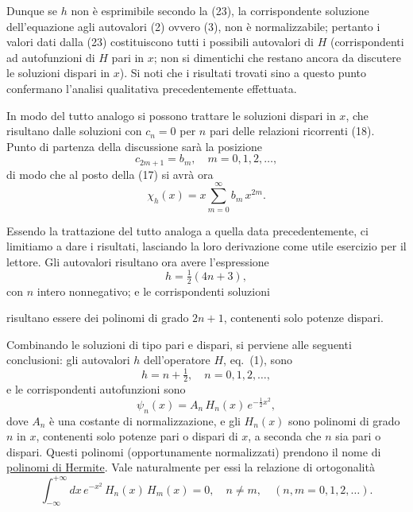 \documentclass[11pt, a4paper]{book}
\numberwithin{equation}{section}
\begin{document}
Dunque se $h$ non è esprimibile secondo la (23), la corrispondente
soluzione dell'equazione agli autovalori (2) ovvero (3), non è
normalizzabile; pertanto i valori dati dalla (23) costituiscono tutti i
possibili autovalori di $H$ (corrispondenti ad autofunzioni di $H$ pari in
$x$; non si dimentichi che restano ancora da discutere le soluzioni dispari
in $x$). Si noti che i risultati trovati sino a questo punto confermano
l'analisi qualitativa precedentemente effettuata.

In modo del tutto analogo si possono trattare le soluzioni dispari in
$x$, che risultano dalle soluzioni con $c_n = 0$ per $n$ pari delle
relazioni ricorrenti (18). Punto di partenza della discussione sarà la
posizione
\begin{equation}
c_{2m+1} = b_m, \quad m = 0, 1, 2, \ldots,
\end{equation}
di modo che al posto della (17) si avrà ora
\begin{equation}
\chi_h(x) = x\sum_{m=0}^{\infty} b_m\,x^{2m}.
\end{equation}

Essendo la trattazione del tutto analoga a quella data precedentemente,
ci limitiamo a dare i risultati, lasciando la loro derivazione come utile
esercizio per il lettore. Gli autovalori risultano ora avere l'espressione
\begin{equation}
h = \tfrac{1}{2}(4n+3),
\end{equation}
con $n$ intero nonnegativo; e le corrispondenti soluzioni


risultano essere dei polinomi di grado $2n+1$, contenenti solo potenze
dispari.

Combinando le soluzioni di tipo pari e dispari, si perviene alle
seguenti conclusioni: gli autovalori $h$ dell'operatore $H$, eq.\ (1),
sono
\begin{equation}
h = n + \tfrac{1}{2}, \quad n = 0, 1, 2, \ldots,
\end{equation}
e le corrispondenti autofunzioni sono
\begin{equation}
\psi_n(x) = A_n\,H_n(x)\,e^{-\frac{1}{2}x^2},
\end{equation}
dove $A_n$ è una costante di normalizzazione, e gli $H_n(x)$ sono polinomi
di grado $n$ in $x$, contenenti solo potenze pari o dispari di $x$, a
seconda che $n$ sia pari o dispari. Questi polinomi (opportunamente
normalizzati) prendono il nome di \underline{polinomi di Hermite}. Vale
naturalmente per essi la relazione di ortogonalità
\begin{equation}
\int_{-\infty}^{+\infty} dx\,e^{-x^2}\,H_n(x)\,H_m(x) = 0, \quad n \neq m,
\quad (n,m = 0,1,2,\ldots).
\end{equation}
\end{document}
